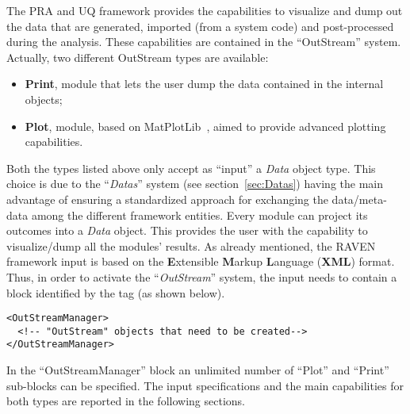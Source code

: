 The PRA and UQ framework provides the capabilities to visualize and dump out the
data that are generated, imported (from a system code) and post-processed during
the analysis.
%
These capabilities are contained in the ``OutStream'' system.
%
Actually, two different OutStream types are available:
\vspace{-5mm}
\begin{itemize}
  \itemsep0em
  \item \textbf{Print}, module that lets the user dump the data contained in the
  internal objects;
  \item \textbf{Plot}, module, based on MatPlotLib~\cite{MatPlotLib}, aimed to
  provide advanced plotting capabilities.
\end{itemize}
\vspace{-5mm}
Both the types listed above only accept as ``input'' a \textit{Data} object
type.
%
This choice is due to the ``\textit{Datas}'' system (see
section~\ref{sec:Datas}) having the main advantage of ensuring a standardized
approach for exchanging the data/meta-data among the different framework
entities.
%
Every module can project its outcomes into a \textit{Data} object.
%
This provides the user with the capability to visualize/dump all the modules'
results.
%
As already mentioned, the RAVEN
framework input is based on the \textbf{E}xtensible \textbf{M}arkup
\textbf{L}anguage (\textbf{XML}) format.
%
Thus, in order to activate the ``\textit{OutStream}'' system, the input needs to
contain a block identified by the  tag (as shown
below).

\begin{lstlisting}[style=XML]
<OutStreamManager>
  <!-- "OutStream" objects that need to be created-->
</OutStreamManager>
\end{lstlisting}

In the ``OutStreamManager'' block an unlimited number of ``Plot'' and ``Print''
sub-blocks can be specified.
%
The input specifications and the main capabilities for both types are reported
in the following sections.
%
%
